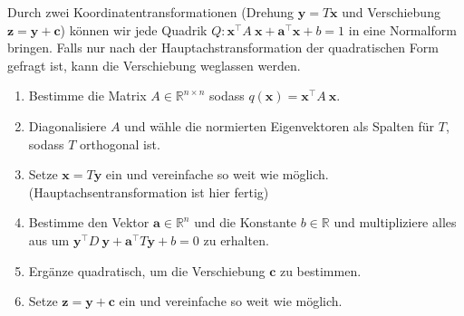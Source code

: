 \begin{tcolorbox}[colback=gray!30, colframe=gray!80, title=Quadriken in Normalform bringen]
    Durch zwei Koordinatentransformationen (Drehung \( \mathbf{y} = T\mathbf{x} \) und Verschiebung \( \mathbf{z} = \mathbf{y} + \mathbf{c} \)) können wir jede Quadrik \( Q: \mathbf{x}^\top A \ \mathbf{x} + \mathbf{a}^\top \mathbf{x} + b = 1 \) in eine Normalform bringen. Falls nur nach der Hauptachstransformation der quadratischen Form gefragt ist, kann die Verschiebung weglassen werden.
    \begin{enumerate}
        \item Bestimme die Matrix \( A \in \mathbb{R}^{n \times n} \) sodass \( q(\mathbf{x}) = \mathbf{x}^\top A \ \mathbf{x} \).
        \item Diagonalisiere \( A \) und wähle die normierten Eigenvektoren als Spalten für \( T \), sodass \( T \) orthogonal ist. 
        \item Setze \( \mathbf{x} = T \mathbf{y} \) ein und vereinfache so weit wie möglich. (Hauptachsentransformation ist hier fertig)
        \item Bestimme den Vektor \( \mathbf{a} \in \mathbb{R}^n \) und die Konstante \( b \in \mathbb{R} \) und multipliziere alles aus um \( \mathbf{y}^\top D \ \mathbf{y} + \mathbf{a}^\top T \mathbf{y} + b = 0 \) zu erhalten.
        \item Ergänze quadratisch, um die Verschiebung \( \mathbf{c} \) zu bestimmen. 
        \item Setze \( \mathbf{z} = \mathbf{y} + \mathbf{c} \) ein und vereinfache so weit wie möglich. 
    \end{enumerate}
\end{tcolorbox}